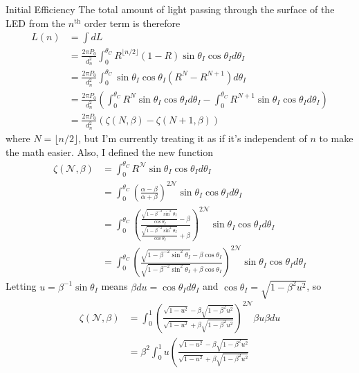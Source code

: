 \documentclass[12pt]{article}
\newcommand{\enterProblemHeader}[1]{
	\rhead{#1}
}
\newenvironment{main_section}[1]{
	\section{#1}
	\enterProblemHeader{#1}
}{
	\pagebreak
}
\begin{document}
\begin{main_section}{Initial Efficiency}
	The total amount of light passing through the surface of the LED from the
	$n^\text{th}$ order term is therefore
	\begin{align*}
		L(n) &= \int dL\\
		&= \frac {2 \pi P_0} {d_n^2} \int_0^{\theta_C} R^{\lfloor n / 2 \rfloor}
		(1 - R) \sin \theta_I \cos \theta_I d\theta_I\\
		&= \frac {2 \pi P_0} {d_n^2} \int_0^{\theta_C} \sin \theta_I \cos
		\theta_I \left( R^N - R^{N + 1} \right) d\theta_I\\
		&= \frac {2 \pi P_0} {d_n^2} \left( \int_0^{\theta_C} R^N \sin \theta_I
		\cos \theta_I d\theta_I - \int_0^{\theta_C} R^{N + 1} \sin \theta_I \cos
		\theta_I d\theta_I \right)\\
		&= \frac {2 \pi P_0} {d_n^2} \left( \zeta(N, \beta) - \zeta(N + 1,
		\beta) \right)
	\end{align*}
	where $N = \lfloor n / 2 \rfloor$, but I'm currently treating it as if it's
	independent of $n$ to make the math easier. Also, I defined the new function
	\begin{align*}
		\zeta(\mathcal N, \beta) &= \int_0^{\theta_C} R^{\mathcal N} \sin
		\theta_I \cos \theta_I d\theta_I\\
		&= \int_0^{\theta_C} \left( \frac {\alpha - \beta} {\alpha + \beta}
		\right)^{2 \mathcal N} \sin \theta_I \cos \theta_I d\theta_I\\
		&= \int_0^{\theta_C} \left( \frac {\frac {\sqrt{1 - \beta^{-2}\sin^2
		\theta_I} } {\cos \theta_I } - \beta} {\frac {\sqrt{1 - \beta^{-2}\sin^2
		\theta_I} } {\cos \theta_I } + \beta} \right)^{2 \mathcal N} \sin
		\theta_I \cos \theta_I d\theta_I\\
		&= \int_0^{\theta_C} \left( \frac { \sqrt{1 - \beta^{-2} \sin^2
		\theta_I} - \beta \cos \theta_I } { \sqrt{1 - \beta^{-2} \sin^2
		\theta_I} + \beta \cos \theta_I } \right)^{2 \mathcal N} \sin \theta_I
		\cos \theta_I d \theta_I
	\end{align*}
	Letting $u = \beta^{-1} \sin \theta_I$ means $\beta du = \cos \theta_I d
	\theta_I$ and $\cos \theta_I = \sqrt{ 1 - \beta^2 u^2 }$, so
	\begin{align*}
		\zeta( \mathcal N, \beta ) &= \int_0^1 \left( \frac { \sqrt{ 1 - u^2 } -
		\beta \sqrt{ 1 - \beta^2 u^2 } } { \sqrt{ 1 - u^2 } + \beta \sqrt{ 1 -
		\beta^2 u^2 } } \right)^{2 \mathcal N} \beta u \beta du\\
		&= \beta^2 \int_0^1 u \left( \frac { \sqrt{1 - u^2} - \beta \sqrt{1 -
		\beta^2 u^2} } { \sqrt{1 - u^2} + \beta \sqrt{1 - \beta^2 u^2}
}
\end{align*}
\end{main_section}
\end{document}
